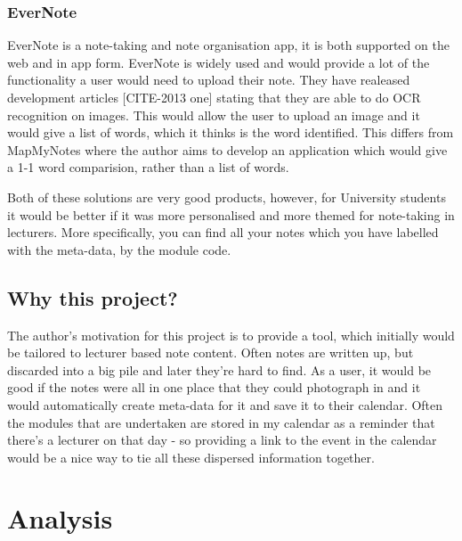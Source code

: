 \subsubsection{EverNote}
EverNote is a note-taking and note organisation app, it is both supported on the web and in app form. EverNote is widely used and would provide a lot of the functionality a user would need to upload their note. They have realeased development articles [CITE-2013 one] stating that they are able to do OCR recognition on images. This would allow the user to upload an image and it would give a list of words, which it thinks is the word identified. This differs from MapMyNotes where the author aims to develop an application which would give a 1-1 word comparision, rather than a list of words.

Both of these solutions are very good products, however, for University students it would be better if it was more personalised and more themed for note-taking in lecturers. More specifically, you can find all your notes which you have labelled with the meta-data, by the module code. 


\subsection{Why this project?}
The author's motivation for this project is to provide a tool, which initially would be tailored to lecturer based note content. Often notes are written up, but discarded into a big pile and later they're hard to find. As a user, it would be good if the notes were all in one place that they could photograph in and it would automatically create meta-data for it and save it to their calendar. Often the modules that are undertaken are stored in my calendar as a reminder that there's a lecturer on that day - so providing a link to the event in the calendar would be a nice way to tie all these dispersed information together.

\section{Analysis}


